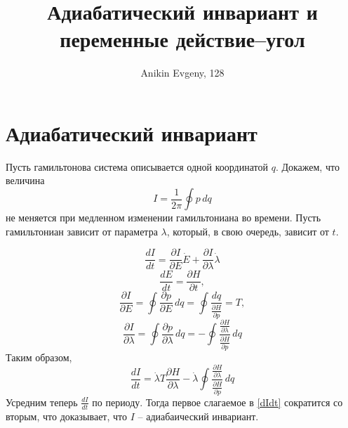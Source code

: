 \documentclass{article}
\title{Адиабатический инвариант и переменные действие--угол}
\author{Anikin Evgeny, 128}
\begin{document}
\maketitle
\section{Адиабатический инвариант}
Пусть гамильтонова система описывается одной координатой $q$. Докажем, что величина
\begin{equation}
	I = \frac{1}{2\pi} \oint p\,dq
\end{equation}
не меняется при медленном изменении гамильтониана во времени. Пусть гамильтониан 
зависит от параметра $\lambda$, который, в свою очередь, зависит от $t$. 

\begin{equation}
	\frac{dI}{dt} = \frac{\partial I}{\partial E} \dot{E} + 
        \frac{\partial I}{\partial \lambda} \dot{\lambda}
\end{equation}
\begin{equation}
	\frac{dE}{dt} = \frac{\partial H}{\partial t},
\end{equation}
\begin{equation}
	\frac{\partial I}{\partial E} = \oint \frac{\partial p}{\partial E} \,dq = 
        \oint \frac{dq}{\frac{\partial H}{\partial p}} = T,
\end{equation}
\begin{equation}
	\frac{\partial I}{\partial \lambda} = \oint \frac{\partial p}{\partial \lambda} \,dq = 
        -\oint \frac{\frac{\partial{H}}{\partial{\lambda}}}{\frac{\partial H}{\partial p}}\,dq
\end{equation}
Таким образом,
\begin{equation}
    \label{dIdt}
	\frac{dI}{dt} = \dot{\lambda}T\frac{\partial H}{\partial \lambda}  
        -\dot{\lambda}
        \oint \frac{\frac{\partial{H}}{\partial{\lambda}}}{\frac{\partial H}{\partial p}}\,dq
\end{equation}
Усредним теперь $\frac{dI}{dt}$ по периоду. Тогда первое слагаемое в \eqref{dIdt} сократится
со вторым, что доказывает, что $I$ -- адиабаический инвариант.
\end{document}
